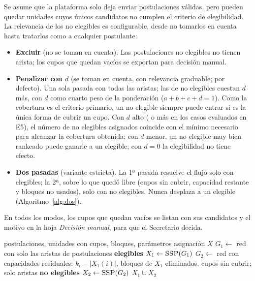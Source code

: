 \documentclass{article}
\begin{document}
Se asume que la plataforma solo deja enviar postulaciones válidas, pero pueden quedar unidades cuyos únicos candidatos no cumplen el criterio de elegibilidad. La relevancia de los no elegibles es configurable, desde no tomarlos en cuenta hasta tratarlos como a cualquier postulante:
\begin{itemize}
    \item \textbf{Excluir} (no se toman en cuenta). Las postulaciones no elegibles no tienen arista; los cupos que quedan vacíos se exportan para decisión manual.
    \item \textbf{Penalizar con $d$} (se toman en cuenta, con relevancia graduable; por defecto). Una sola pasada con todas las aristas; las de no elegibles cuestan $d$ más, con $d$ como cuarto peso de la ponderación ($a + b + c + d = 1$). Como la cobertura es el criterio primario, un no elegible siempre puede entrar si es la única forma de cubrir un cupo. Con $d$ alto (\neDCritico{} o más en los casos evaluados en E5), el número de no elegibles asignados coincide con el mínimo necesario para alcanzar la cobertura obtenida; con $d$ menor, un no elegible muy bien rankeado puede ganarle a un elegible; con $d = 0$ la elegibilidad no tiene efecto.
    \item \textbf{Dos pasadas} (variante estricta). La 1ª pasada resuelve el flujo solo con elegibles; la 2ª, sobre lo que quedó libre (cupos sin cubrir, capacidad restante y bloques no usados), solo con no elegibles. Nunca desplaza a un elegible (Algoritmo~\ref{alg:dos}).
\end{itemize}
En todos los modos, los cupos que quedan vacíos se listan con sus candidatos y el motivo en la hoja \emph{Decisión manual}, para que el Secretario decida.

\begin{algorithm}[H]
\caption{Asignación en dos pasadas}
\label{alg:dos}
\begin{algorithmic}[1]
\Require postulaciones, unidades con cupos, bloques, parámetros
\Ensure asignación $X$
\State $G_1 \gets$ red con solo las aristas de postulaciones \textbf{elegibles}
\State $X_1 \gets \textsc{SSP}(G_1)$ 
\State $G_2 \gets$ red con capacidades residuales: $k_i - |X_1(i)|$, bloques de $X_1$ eliminados, cupos sin cubrir; solo aristas \textbf{no elegibles}
\State $X_2 \gets \textsc{SSP}(G_2)$
\State \Return $X_1 \cup X_2$ 
\end{algorithmic}
\end{algorithm}
\end{document}
